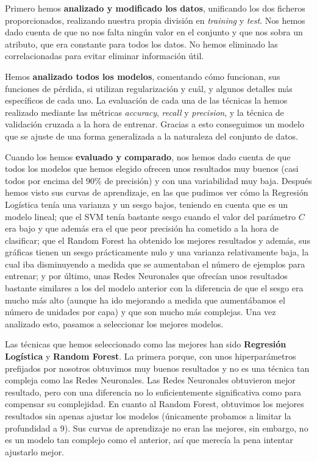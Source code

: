 \documentclass[11pt,a4paper]{article}
\begin{document}
Primero hemos \textbf{analizado y modificado los datos}, unificando los dos ficheros proporcionados, realizando nuestra propia división en
\textit{training} y \textit{test}. Nos hemos dado cuenta de que no nos falta ningún valor en el conjunto y que nos sobra un atributo, que
era constante para todos los datos. No hemos eliminado las correlacionadas para evitar eliminar información útil.

Hemos \textbf{analizado todos los modelos}, comentando cómo funcionan, sus funciones de pérdida, si utilizan regularización y cuál, y algunos
detalles más específicos de cada uno. La evaluación de cada una de las técnicas la hemos realizado mediante las métricas
\textit{accuracy}, \textit{recall} y \textit{precision}, y la técnica de validación cruzada a la hora de entrenar. Gracias a esto
conseguimos un modelo que se ajuste de una forma generalizada a la naturaleza del conjunto de datos.

Cuando los hemos \textbf{evaluado y comparado}, nos hemos dado cuenta de que todos los modelos que hemos elegido ofrecen unos resultados muy buenos 
(casi todos por encima del 90\% de precisión) y con una variabilidad muy baja. Después hemos visto sus curvas de aprendizaje, en las que pudimos
ver cómo la Regresión Logística tenía una varianza y un sesgo bajos, teniendo en cuenta que es un modelo lineal; que el SVM tenía bastante sesgo
cuando el valor del parámetro $C$ era bajo y que además era el que peor precisión ha cometido a la hora de clasificar; que el Random Forest
ha obtenido los mejores resultados y además, sus gráficas tienen un sesgo prácticamente nulo y una varianza relativamente baja, la cual 
iba disminuyendo a medida que se aumentaban el número de ejemplos para entrenar; y por último, unas Redes Neuronales que ofrecían unos resultados
bastante similares a los del modelo anterior con la diferencia de que el sesgo era mucho más alto (aunque ha ido mejorando a medida que aumentábamos el
número de unidades por capa) y que son mucho más complejas. Una vez analizado esto, pasamos a seleccionar los mejores modelos.

Las técnicas que hemos seleccionado como las mejores han sido \textbf{Regresión Logística} y \textbf{Random Forest}. La primera porque,
con unos hiperparámetros prefijados por nosotros obtuvimos muy buenos resultados y no es una técnica tan compleja como las Redes
Neuronales. Las Redes Neuronales obtuvieron mejor resultado, pero con una diferencia no lo suficientemente significativa como para
compensar su complejidad. En cuanto al Random Forest, obtuvimos los mejores resultados sin apenas ajustar los modelos (únicamente probamos
a limitar la profundidad a 9). Sus curvas de aprendizaje no eran las mejores, sin embargo, no es un modelo tan complejo como el anterior,
así que merecía la pena intentar ajustarlo mejor.
\end{document}
